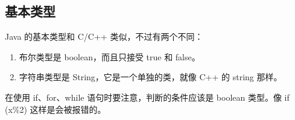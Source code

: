 \subsection{基本类型}
	Java 的基本类型和 C/C++ 类似，不过有两个不同：
	
	\begin{enumerate}
		\item 布尔类型是 boolean，而且只接受 true 和 false。
		\item 字符串类型是 String，它是一个单独的类，就像 C++ 的 string 那样。
	\end{enumerate}
	
	在使用 if、for、while 语句时要注意，判断的条件应该是 boolean 类型。像 if (x\%2) 这样是会被报错的。